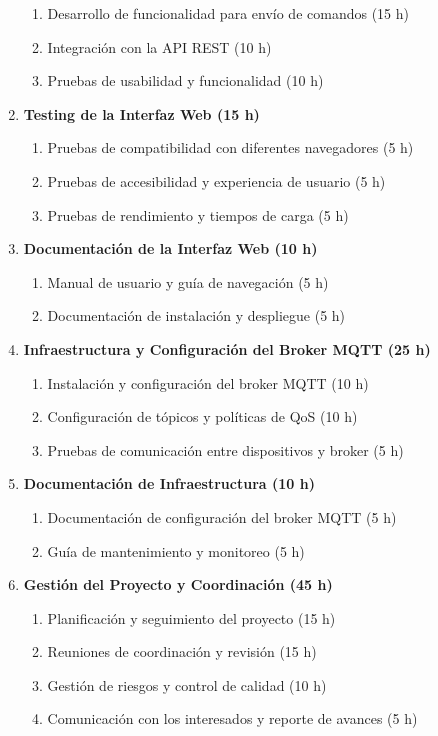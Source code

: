 \documentclass[
11pt, %
]{charter}
\begin{document}
\begin{enumerate}
\begin{enumerate}
\item Desarrollo de funcionalidad para envío de comandos (15 h)
\item Integración con la API REST (10 h)
\item Pruebas de usabilidad y funcionalidad (10 h)
\end{enumerate}
\item \textbf{Testing de la Interfaz Web (15 h)}
\begin{enumerate}
\item Pruebas de compatibilidad con diferentes navegadores (5 h)
\item Pruebas de accesibilidad y experiencia de usuario (5 h)
\item Pruebas de rendimiento y tiempos de carga (5 h)
\end{enumerate}
\item \textbf{Documentación de la Interfaz Web (10 h)}
\begin{enumerate}
\item Manual de usuario y guía de navegación (5 h)
\item Documentación de instalación y despliegue (5 h)
\end{enumerate}
\item \textbf{Infraestructura y Configuración del Broker MQTT (25 h)}
\begin{enumerate}
\item Instalación y configuración del broker MQTT (10 h)
\item Configuración de tópicos y políticas de QoS (10 h)
\item Pruebas de comunicación entre dispositivos y broker (5 h)
\end{enumerate}
\item \textbf{Documentación de Infraestructura (10 h)}
\begin{enumerate}
\item Documentación de configuración del broker MQTT (5 h)
\item Guía de mantenimiento y monitoreo (5 h)
\end{enumerate}
\item \textbf{Gestión del Proyecto y Coordinación (45 h)}
\begin{enumerate}
\item Planificación y seguimiento del proyecto (15 h)
\item Reuniones de coordinación y revisión (15 h)
\item Gestión de riesgos y control de calidad (10 h)
\item Comunicación con los interesados y reporte de avances (5 h)

\end{enumerate}
\end{enumerate}
\end{document}
